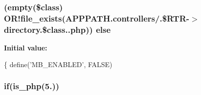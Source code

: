 \subsubsection[{else}]{ (empty(\$class) O\+R!file\+\_\+exists(A\+P\+P\+P\+A\+T\+H.\textquotesingle{}controllers/\textquotesingle{}.\$R\+T\+R-\/$>$directory.\$class.\textquotesingle{}.php\textquotesingle{})) else}\label{_code_igniter_8php_ac5109000d551293e102a2bc06f29cda4}
{\bfseries Initial value\+:}
\begin{DoxyCode}
\{
        define(\textcolor{stringliteral}{'MB\_ENABLED'}, FALSE)
\end{DoxyCode}
\hypertarget{_code_igniter_8php_a6503a8f8da73cafe64ad07639c198f54}{}
\subsubsection[{if}]{\setlength{\rightskip}{0pt plus 5cm}if({\bf is\+\_\+php}(\textquotesingle{}5.\textquotesingle{}))}\label{_code_igniter_8php_a6503a8f8da73cafe64ad07639c198f54}
